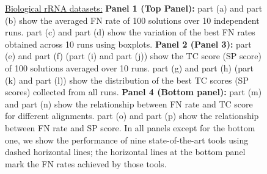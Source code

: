 \begin{figure}[!htbp]
\begin{adjustwidth}{-0.5cm}{-0.5cm}
	\caption{\underline{Biological rRNA datasets:} \textbf{Panel 1 (Top Panel):} part (a) and part (b) show the averaged FN rate of 100 solutions over 10 independent runs. 
		part (c) and part (d) show the variation of the best FN rates obtained across 10 runs using boxplots.  %
		\textbf{Panel 2 (Panel 3):} part (e) and part (f) (part (i) and part (j)) show the TC score (SP score) of 100  solutions averaged over 10 runs. 
		part (g) and part (h) (part (k) and part (l)) show the distribution of the best TC scores (SP scores) collected from all runs.
		\textbf{Panel 4 (Bottom panel):} part (m) and part (n) show the relationship between FN rate and TC score for different alignments. part (o) and part (p) show the relationship between FN rate and SP score. In all panels except for the bottom one, we show the performance of nine state-of-the-art tools using dashed horizontal lines; the horizontal lines at the bottom panel mark the FN rates achieved by those tools.
	}
	\label{fig:fn_rate_tc_sp_bio}
\end{adjustwidth}
\end{figure}



